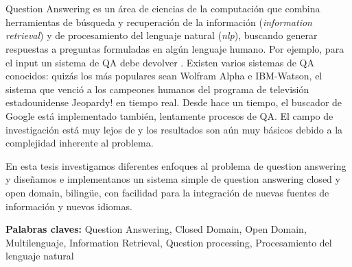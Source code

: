 \chapter*{\runtitulo}

Question Answering es un área de ciencias de la computación que combina herramientas de búsqueda y recuperación
de la información (\textit{information retrieval}) y de procesamiento del lenguaje natural (\textit{nlp}), buscando
generar respuestas a preguntas formuladas en algún lenguaje humano.
Por ejemplo, para el input \textit{} un sistema de QA debe devolver . 
Existen varios sistemas de QA conocidos: quizás los más populares sean Wolfram Alpha e IBM-Watson, el sistema que venció a los campeones humanos del 
programa de televisión estadounidense Jeopardy! en tiempo real. Desde hace un tiempo, el buscador de Google está implementado también, lentamente
procesos de QA. El campo de investigación está muy lejos de  y los resultados son aún muy básicos debido a la complejidad inherente al problema. 

En esta tesis investigamos diferentes enfoques al problema de question answering y diseñamos e implementanos un sistema simple de question answering closed y open domain, bilingüe, con facilidad para la integración de nuevas fuentes de información y nuevos idiomas.
\bigskip

\noindent\textbf{Palabras claves:} Question Answering, Closed Domain, Open Domain, Multilenguaje, Information Retrieval, Question processing, Procesamiento del lenguaje natural
